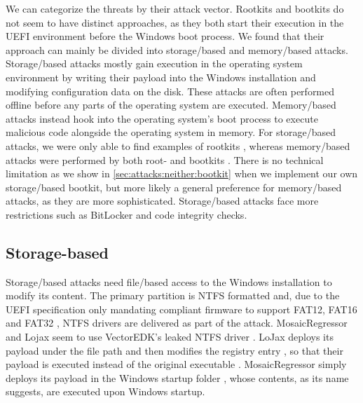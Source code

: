 We can categorize the threats by their attack vector.
Rootkits and bootkits do not seem to have distinct approaches, as they both start their execution in the \ac{UEFI} environment before the Windows boot process.
We found that their approach can mainly be divided into storage\-/based and memory\-/based attacks.
Storage\-/based attacks mostly gain execution in the operating system environment by writing their payload into the Windows installation and modifying configuration data on the disk.
These attacks are often performed offline before any parts of the operating system are executed.
Memory\-/based attacks instead hook into the operating system's boot process to execute malicious code alongside the operating system in memory.
For storage\-/based attacks, we were only able to find examples of rootkits \cite{vector-edk,mosaicregressor-technical-details,lojax}, whereas memory\-/based attacks were performed by both root- and bootkits \cite{dreamboot,efiguard,especter,finspy,moonbounce,cosmicstrand}.
There is no technical limitation as we show in \autoref{sec:attacks:neither:bootkit} when we implement our own storage\-/based bootkit, but more likely a general preference for memory\-/based attacks, as they are more sophisticated.
Storage\-/based attacks face more restrictions such as BitLocker and code integrity checks.

\subsection{Storage-based}

Storage\-/based attacks need file\-/based access to the Windows installation to modify its content.
The primary partition is \ac{NTFS} formatted and, due to the \ac{UEFI} specification only mandating compliant firmware to support \ac{FAT}12, \ac{FAT}16 and \ac{FAT}32 \cite[Section 13.3.1.1]{uefi-spec}, \ac{NTFS} drivers are delivered as part of the attack.
MosaicRegressor and Lojax seem to use VectorEDK's leaked \ac{NTFS} driver \cite{mosaicregressor-technical-details, lojax}.
LoJax deploys its payload under the file path  and then modifies the registry entry , so that their payload is executed instead of the original executable \cite{lojax}.
MosaicRegressor simply deploys its payload in the Windows startup folder \cite{mosaicregressor-technical-details}, whose contents, as its name suggests, are executed upon Windows startup.

